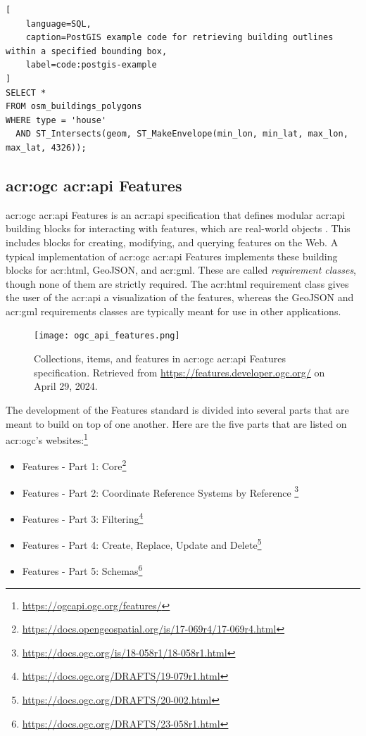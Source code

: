 \begin{lstlisting}[
    language=SQL,
    caption=PostGIS example code for retrieving building outlines within a specified bounding box,
    label=code:postgis-example
]
SELECT * 
FROM osm_buildings_polygons 
WHERE type = 'house' 
  AND ST_Intersects(geom, ST_MakeEnvelope(min_lon, min_lat, max_lon, max_lat, 4326));
\end{lstlisting}

\subsection[OGC API Features]{\acrshort{acr:ogc} \acrshort{acr:api} Features}
\label{subsec:ogc-api-features}

\acrshort{acr:ogc} \acrshort{acr:api} Features is an \acrshort{acr:api} specification that defines modular \acrshort{acr:api} building blocks for interacting with features, which are real-world objects \citep{opengeospatialconsortiumOGCAPIFeatures2022}. This includes blocks for creating, modifying, and querying features on the Web. A typical implementation of \acrshort{acr:ogc} \acrshort{acr:api} Features implements these building blocks for \acrshort{acr:html}, GeoJSON, and \acrshort{acr:gml}. These are called \textit{requirement classes}, though none of them are strictly required. The \acrshort{acr:html} requirement class gives the user of the \acrshort{acr:api} a visualization of the features, whereas the GeoJSON and \acrshort{acr:gml} requirements classes are typically meant for use in other applications.

\begin{figure}[h]
    \centering
    \texttt{[image: ogc\_api\_features.png]}
    \caption{Collections, items, and features in \acrshort{acr:ogc} \acrshort{acr:api} Features specification. Retrieved from \url{https://features.developer.ogc.org/} on April 29, 2024.}
    \label{fig:oaf-collections-items-features}
\end{figure}

The development of the Features standard is divided into several parts that are meant to build on top of one another. Here are the five parts that are listed on \acrshort{acr:ogc}'s websites:\footnote{\url{https://ogcapi.ogc.org/features/}}

\begin{itemize}
    \item Features - Part 1: Core\footnote{\url{https://docs.opengeospatial.org/is/17-069r4/17-069r4.html}}
    \item Features - Part 2: Coordinate Reference Systems by Reference \footnote{\url{https://docs.ogc.org/is/18-058r1/18-058r1.html}}
    \item Features - Part 3: Filtering\footnote{\url{https://docs.ogc.org/DRAFTS/19-079r1.html}}
    \item Features - Part 4: Create, Replace, Update and Delete\footnote{\url{https://docs.ogc.org/DRAFTS/20-002.html}}
    \item Features - Part 5: Schemas\footnote{\url{https://docs.ogc.org/DRAFTS/23-058r1.html}}
\end{itemize}

